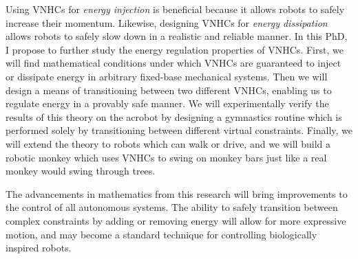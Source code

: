 \documentclass[a4paper,12pt]{article}
\begin{document}
Using VNHCs for \textit{energy injection} is beneficial because it allows robots to
safely increase their momentum.
Likewise, designing VNHCs for \textit{energy dissipation} allows robots to
safely slow down in a realistic and reliable manner. 
In this PhD, I propose to further study the energy regulation properties of VNHCs.
First, we will find mathematical conditions under which VNHCs are guaranteed to
inject or dissipate energy in arbitrary fixed-base mechanical systems.
Then we will design a means of transitioning between two different VNHCs,
enabling us to regulate energy in a provably safe manner.
We will experimentally verify the results of this theory on the acrobot by
designing a gymnastics routine which is performed solely by transitioning
between different virtual constraints.
Finally, we will extend the theory to robots which can walk or drive, 
and we will build a robotic monkey which uses VNHCs to swing on monkey bars just
like a real monkey would swing through trees.

The advancements in mathematics from this research will bring improvements
to the control of all autonomous systems. 
The ability to safely transition between complex constraints by adding or
removing energy will allow for more expressive motion, and may become a standard
technique for controlling biologically inspired robots.

\newpage
\printbibliography
\end{document}
